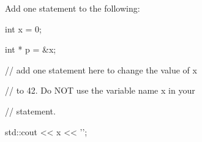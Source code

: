 Add one statement to the following:

\begin{consolethree}[escapeinside=||]

int x = 0;

int * p = &x;



// add one statement here to change the value of x

// to 42. Do NOT use the variable name x in your

// statement.



std::cout << x << '\n';

\end{consolethree}

